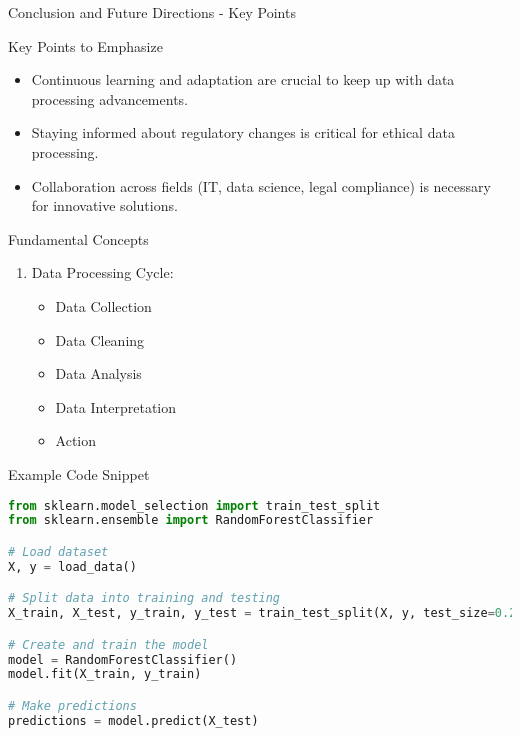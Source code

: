\documentclass[aspectratio=169]{beamer}
\begin{document}
\begin{frame}[fragile]{Conclusion and Future Directions - Key Points}
    \begin{block}{Key Points to Emphasize}
        \begin{itemize}
            \item Continuous learning and adaptation are crucial to keep up with data processing advancements.
            \item Staying informed about regulatory changes is critical for ethical data processing.
            \item Collaboration across fields (IT, data science, legal compliance) is necessary for innovative solutions.
        \end{itemize}
    \end{block}

    \begin{block}{Fundamental Concepts}
        \begin{enumerate}
            \item Data Processing Cycle:
                \begin{itemize}
                    \item Data Collection
                    \item Data Cleaning
                    \item Data Analysis
                    \item Data Interpretation
                    \item Action
                \end{itemize}
        \end{enumerate}
    \end{block}
\end{frame}

\begin{frame}[fragile]{Example Code Snippet}
    \begin{lstlisting}[language=Python]
from sklearn.model_selection import train_test_split
from sklearn.ensemble import RandomForestClassifier

# Load dataset
X, y = load_data() 

# Split data into training and testing
X_train, X_test, y_train, y_test = train_test_split(X, y, test_size=0.2)

# Create and train the model
model = RandomForestClassifier()
model.fit(X_train, y_train) 

# Make predictions
predictions = model.predict(X_test)
    \end{lstlisting}
\end{frame}
\end{document}
